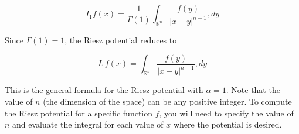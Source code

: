 \documentclass[11pt,a4paper]{report}
\theoremstyle{definition}
\begin{document}
$$I_1 f(x) = \frac{1}{\Gamma(1)} \int_{\mathbb{R}^n} \frac{f(y)}{|x-y|^{n-1}} ,dy$$

Since $\Gamma(1) = 1$, the Riesz potential reduces to

$$I_1 f(x) = \int_{\mathbb{R}^n} \frac{f(y)}{|x-y|^{n-1}} ,dy$$

This is the general formula for the Riesz potential with $\alpha=1$. Note that the value of $n$ (the dimension of the space) can be any positive integer. To compute the Riesz potential for a specific function $f$, you will need to specify the value of $n$ and evaluate the integral for each value of $x$ where the potential is desired.


{}
\end{document}

